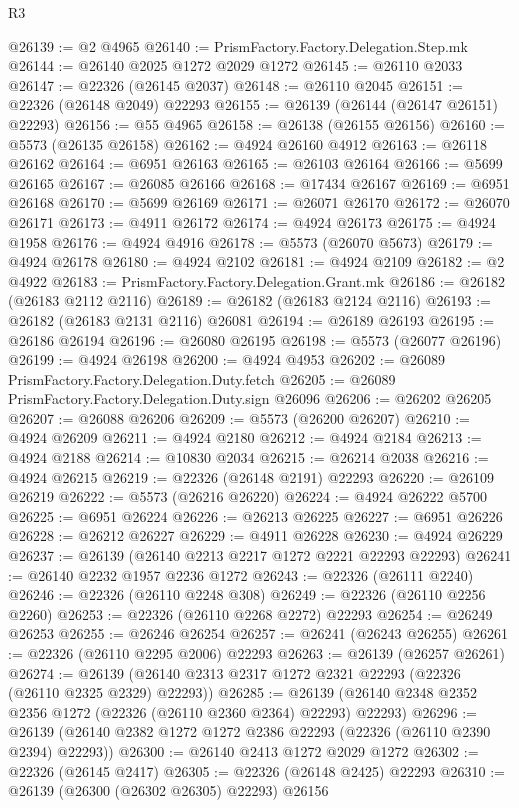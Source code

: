 \begin{lexlean}{R3}
\begin{coremodule}
@26139 := @2 @4965
@26140 := PrismFactory.Factory.Delegation.Step.mk
@26144 := @26140 @2025 @1272 @2029 @1272
@26145 := @26110 @2033
@26147 := @22326 (@26145 @2037)
@26148 := @26110 @2045
@26151 := @22326 (@26148 @2049) @22293
@26155 := @26139 (@26144 (@26147 @26151) @22293)
@26156 := @55 @4965
@26158 := @26138 (@26155 @26156)
@26160 := @5573 (@26135 @26158)
@26162 := @4924 @26160 @4912
@26163 := @26118 @26162
@26164 := @6951 @26163
@26165 := @26103 @26164
@26166 := @5699 @26165
@26167 := @26085 @26166
@26168 := @17434 @26167
@26169 := @6951 @26168
@26170 := @5699 @26169
@26171 := @26071 @26170
@26172 := @26070 @26171
@26173 := @4911 @26172
@26174 := @4924 @26173
@26175 := @4924 @1958
@26176 := @4924 @4916
@26178 := @5573 (@26070 @5673)
@26179 := @4924 @26178
@26180 := @4924 @2102
@26181 := @4924 @2109
@26182 := @2 @4922
@26183 := PrismFactory.Factory.Delegation.Grant.mk
@26186 := @26182 (@26183 @2112 @2116)
@26189 := @26182 (@26183 @2124 @2116)
@26193 := @26182 (@26183 @2131 @2116) @26081
@26194 := @26189 @26193
@26195 := @26186 @26194
@26196 := @26080 @26195
@26198 := @5573 (@26077 @26196)
@26199 := @4924 @26198
@26200 := @4924 @4953
@26202 := @26089 PrismFactory.Factory.Delegation.Duty.fetch
@26205 := @26089 PrismFactory.Factory.Delegation.Duty.sign @26096
@26206 := @26202 @26205
@26207 := @26088 @26206
@26209 := @5573 (@26200 @26207)
@26210 := @4924 @26209
@26211 := @4924 @2180
@26212 := @4924 @2184
@26213 := @4924 @2188
@26214 := @10830 @2034
@26215 := @26214 @2038
@26216 := @4924 @26215
@26219 := @22326 (@26148 @2191) @22293
@26220 := @26109 @26219
@26222 := @5573 (@26216 @26220)
@26224 := @4924 @26222 @5700
@26225 := @6951 @26224
@26226 := @26213 @26225
@26227 := @6951 @26226
@26228 := @26212 @26227
@26229 := @4911 @26228
@26230 := @4924 @26229
@26237 := @26139 (@26140 @2213 @2217 @1272 @2221 @22293 @22293)
@26241 := @26140 @2232 @1957 @2236 @1272
@26243 := @22326 (@26111 @2240)
@26246 := @22326 (@26110 @2248 @308)
@26249 := @22326 (@26110 @2256 @2260)
@26253 := @22326 (@26110 @2268 @2272) @22293
@26254 := @26249 @26253
@26255 := @26246 @26254
@26257 := @26241 (@26243 @26255)
@26261 := @22326 (@26110 @2295 @2006) @22293
@26263 := @26139 (@26257 @26261)
@26274 := @26139 (@26140 @2313 @2317 @1272 @2321 @22293 (@22326 (@26110 @2325 @2329) @22293))
@26285 := @26139 (@26140 @2348 @2352 @2356 @1272 (@22326 (@26110 @2360 @2364) @22293) @22293)
@26296 := @26139 (@26140 @2382 @1272 @1272 @2386 @22293 (@22326 (@26110 @2390 @2394) @22293))
@26300 := @26140 @2413 @1272 @2029 @1272
@26302 := @22326 (@26145 @2417)
@26305 := @22326 (@26148 @2425) @22293
@26310 := @26139 (@26300 (@26302 @26305) @22293) @26156

\end{coremodule}
\end{lexlean}
